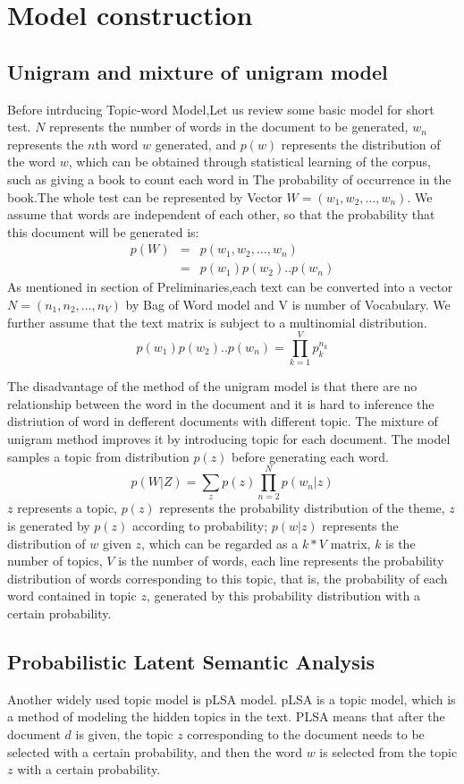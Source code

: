 \section{Model construction}\label{lca}
\subsection{Unigram and mixture of unigram model}
Before intrducing Topic-word Model,Let us review some basic model for short test.
$N$ represents the number of words in the document to be generated, $w_n$ represents the $n$th word $w$ generated, and $p(w)$ represents the distribution of the word $w$, which can be obtained through statistical learning of the corpus, such as giving a book to count each word in The probability of occurrence in the book.The whole test can be represented by Vector $W = (w_1,w_2,\dots,w_n)$.
We assume that words are independent of each other, so that the probability that this document will be generated is:
\begin{eqnarray*}
p(W) &=& p(w_1,w_2,\dots,w_n) \\
    &=& p(w_1)p(w_2)..p(w_n)
\end{eqnarray*}
As mentioned in section of Preliminaries,each text can be converted into a vector $N=(n_1,n_2,\dots,n_V)$ by Bag of Word model and V is number of Vocabulary.
We further assume that the text matrix is subject to a multinomial distribution.
\[
  p(w_1)p(w_2)..p(w_n) = \prod_{k=1}^V p_k^{n_k}
\]


The disadvantage of the method of the unigram model is that there are no relationship between the word in  the document and it is hard to inference the distriution of word in defferent documents with different topic. The mixture of unigram\cite{tcf} method improves it by introducing topic for each document. The model samples a topic from distribution $p(z)$ before generating each word.
\[
  p(W|Z) = \sum_zp(z)\prod_{n=2}^{N}p(w_n|z)
\]
$z$ represents a topic, $p(z)$ represents the probability distribution of the theme, $z$ is generated by $p(z)$ according to probability; $ p(w|z)$ represents the distribution of $w$ given $z$, which can be regarded as a $k * V$ matrix, $k$ is the number of topics, $V$ is the number of words, each line represents the probability distribution of words corresponding to this topic, that is, the probability of each word contained in topic $z$, generated by this probability distribution with a certain probability.

\subsection{Probabilistic Latent Semantic Analysis}
Another widely used topic model is pLSA model. pLSA is a topic model, which is a method of modeling the hidden topics in the text. PLSA means that after the document $d$ is given, the topic $z$ corresponding to the document needs to be selected with a certain probability, and then the word $w$ is selected from the topic $z$ with a certain probability\cite{plsa}.

